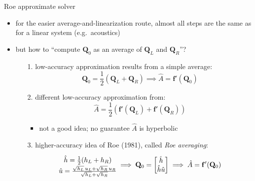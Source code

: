 \documentclass[10pt,dvipsnames,usepdftitle=false,
hyperref={pdftitle = {Finite volume methods},
    pdfauthor = {Ed Bueler}}]{beamer}
\newcommand{\bbf}{\mathbf{f}}
\newcommand{\bQ}{\mathbf{Q}}
\begin{document}
\begin{frame}{Roe approximate solver}

\begin{itemize}
\item for the easier average-and-linearization route, almost all steps are the same as for a linear system (e.g.~acoustics)
\item but how to ``compute $\bQ_0$ as an average of $\bQ_L$ and $\bQ_R$''?
    \begin{itemize}
    \item[1.] low-accuracy approximation results from a simple average:
        $$\bQ_0 = \frac{1}{2} \left(\bQ_L + \bQ_R\right) \implies \hat A = \bbf'(\bQ_0)$$
    \item[2.] different low-accuracy approximation from:
        $$\hat A = \frac{1}{2} \left(\bbf'(\bQ_L) + \bbf'(\bQ_R)\right)$$

        \begin{itemize}
        \item not a good idea; no guarantee $\hat A$ is hyperbolic
        \end{itemize}
    \item[3.] higher-accuracy idea of Roe (1981), called \emph{Roe averaging}:
        $$\begin{matrix} \hat h = \frac{1}{2} (h_L + h_R) {\Large\strut} \\
\hat u = \frac{\sqrt{h_L}\, u_L + \sqrt{h_R}\, u_R}{\sqrt{h_L} + \sqrt{h_R}}
\end{matrix}
\implies \bQ_0 = \begin{bmatrix} \hat h \\ \hat h \hat u \end{bmatrix} \implies \hat A = \bbf'(\bQ_0)$$
    \end{itemize}
\end{itemize}
\end{frame}
\end{document}
